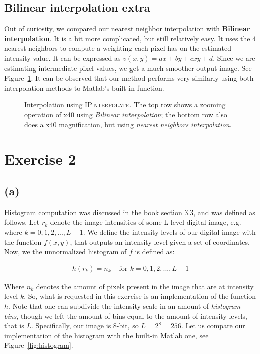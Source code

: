 \documentclass{article}
\begin{document}
\subsection*{Bilinear interpolation extra}
Out of curiosity, we compared our nearest neighbor interpolation with \textbf{Bilinear interpolation}. It is a bit more complicated, but still relatively easy. It uses the 4 nearest neighbors to compute a weighting each pixel has on the estimated intensity value. It can be expressed as $v(x, y) = ax + by + cxy + d$. Since we are estimating intermediate pixel values, we get a much smoother output image. See Figure~\ref{fig:bilinear}. It can be observed that our method performs very similarly using both interpolation methods to Matlab's built-in function.

\begin{figure}[ht]
    \centering
    
    
    \caption{Interpolation using \textsc{IPinterpolate}. The top row shows a zooming operation of x40 using \textit{Bilinear interpolation}; the bottom row also does a x40 magnification, but using \textit{nearest neighbors interpolation}.}
    \label{fig:bilinear}
\end{figure}

\section*{Exercise 2}
\subsection*{(a)} Histogram computation was discussed in the book section 3.3, and was defined as follows. Let $r_k$ denote the image intensities of some L-level digital image, e.g. where $k = 0,1,2,...,L-1$. We define the intensity levels of our digital image with the function $f(x, y)$, that outputs an intensity level given a set of coordinates. Now, we the unnormalized histogram of $f$ is defined as:

\[
\begin{aligned}
h(r_k)=n_k & \text{ for $k=0,1,2,...,L-1$}
\end{aligned}
\]

Where $n_k$ denotes the amount of pixels present in the image that are at intensity level $k$. So, what is requested in this exercise is an implementation of the function $h$. Note that one can subdivide the intensity scale in an amount of \textit{histogram bins}, though we left the amount of bins equal to the amount of intensity levels, that is $L$. Specifically, our image is 8-bit, so $L = 2^8 = 256$. Let us compare our implementation of the histogram with the built-in Matlab one, see Figure~\ref{fig:histogram}.
\end{document}
